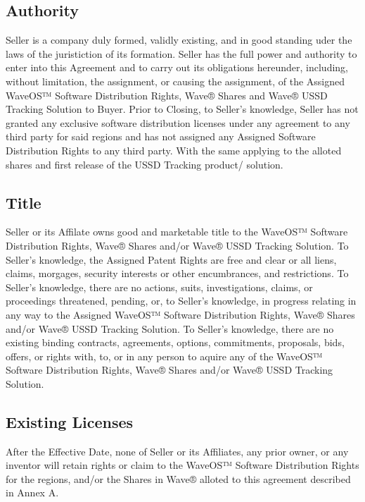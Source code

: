 \documentclass[letterpaper,10pt,english]{sphinxmanual}
\begin{document}
\subsection{Authority}
\label{\detokenize{6-representations:authority}}
Seller is a company duly formed, validly existing, and in good standing uder the laws of the juristiction of its formation. Seller has the full power and authority to enter into this Agreement and to carry out its obligations hereunder, including, without limitation, the assignment, or causing the assignment, of the Assigned WaveOS™ Software Distribution Rights, Wave® Shares and Wave® USSD Tracking Solution to Buyer. Prior to Closing, to Seller’s knowledge, Seller has not granted any exclusive software distribution licenses under any agreement to any third party for said regions and has not assigned any Assigned Software Distribution Rights to any third party. With the same applying to the alloted shares and first release of the USSD Tracking product/ solution.


\subsection{Title}
\label{\detokenize{6-representations:title}}
Seller or its Affilate owns good and marketable title to the WaveOS™ Software Distribution Rights, Wave® Shares and/or Wave® USSD Tracking Solution. To Seller’s knowledge, the Assigned Patent Rights are free and clear or all liens, claims, morgages, security interests or other encumbrances, and restrictions. To Seller’s knowledge, there are no actions, suits, investigations, claims, or proceedings threatened, pending, or, to Seller’s knowledge, in progress relating in any way to the Assigned WaveOS™ Software Distribution Rights, Wave® Shares and/or Wave® USSD Tracking Solution. To Seller’s knowledge, there are no existing binding contracts, agreements, options, commitments, proposals, bids, offers, or rights with, to, or in any person to aquire any of the WaveOS™ Software Distribution Rights, Wave® Shares and/or Wave® USSD Tracking Solution.


\subsection{Existing Licenses}
\label{\detokenize{6-representations:existing-licenses}}
After the Effective Date, none of Seller or its Affiliates, any prior owner, or any inventor will retain rights or claim to the WaveOS™ Software Distribution Rights for the regions, and/or the Shares in Wave® alloted to this agreement described in Annex A.
\end{document}

